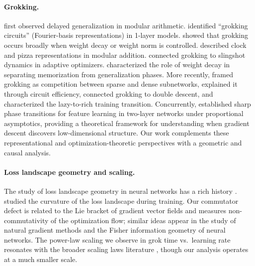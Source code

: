 \documentclass[11pt]{article}
\begin{document}
\paragraph{Grokking.}
\citet{power2022grokking} first observed delayed generalization in modular arithmetic.
\citet{nanda2023grokking} identified ``grokking circuits'' (Fourier-basis representations) in 1-layer models.
\citet{liu2022omnigrok} showed that grokking occurs broadly when weight decay or weight norm is controlled.
\citet{zhong2024clock} described clock and pizza representations in modular addition.
\citet{thilak2022slingshot} connected grokking to slingshot dynamics in adaptive optimizers.
\citet{lyu2024dichotomy} characterized the role of weight decay in separating memorization from generalization phases.
More recently, \citet{merrill2023tale} framed grokking as competition between sparse and dense subnetworks, \citet{varma2023explaining} explained it through circuit efficiency, \citet{davies2023unifying} connected grokking to double descent, and \citet{kumar2024grokking} characterized the lazy-to-rich training transition.
Concurrently, \citet{montanari2026phase} established sharp phase transitions for feature learning in two-layer networks under proportional asymptotics, providing a theoretical framework for understanding when gradient descent discovers low-dimensional structure.
Our work complements these representational and optimization-theoretic perspectives with a geometric and causal analysis.

\paragraph{Loss landscape geometry and scaling.}
The study of loss landscape geometry in neural networks has a rich history \citep{li2018visualizing, draxler2018essentially, garipov2018loss}.
\citet{fort2019large} studied the curvature of the loss landscape during training.
Our commutator defect is related to the Lie bracket of gradient vector fields and measures non-commutativity of the optimization flow; similar ideas appear in the study of natural gradient methods \citep{amari1998natural} and the Fisher information geometry of neural networks.
The power-law scaling we observe in grok time vs.\ learning rate resonates with the broader scaling laws literature \citep{kaplan2020scaling}, though our analysis operates at a much smaller scale.
\end{document}
